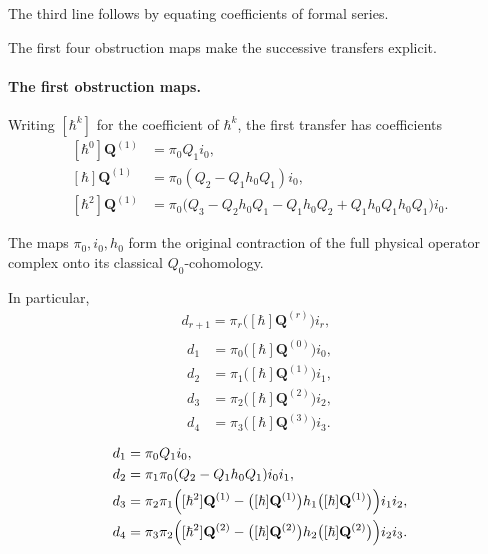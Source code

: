\documentclass[11pt]{article}
\numberwithin{equation}{section}
\numberwithin{figure}{section}
\numberwithin{table}{section}
\begin{document}
The third line follows by equating coefficients of formal series.

The first four obstruction maps make the successive transfers explicit.

\paragraph{The first obstruction maps.}\label{the-first-obstruction-maps}

Writing $[\hbar^k]$ for the coefficient of $\hbar^k$, the first transfer has coefficients
\begin{equation}\label{eq-first-page-series}
\begin{aligned}
[\hbar^0]\mathbf Q^{(1)}&=\pi_0Q_1i_0,\\
[\hbar]\mathbf Q^{(1)}&=\pi_0(Q_2-Q_1h_0Q_1)i_0,\\
[\hbar^2]\mathbf Q^{(1)}&=\pi_0\bigl(
Q_3-Q_2h_0Q_1-Q_1h_0Q_2
+Q_1h_0Q_1h_0Q_1\bigr)i_0.
\end{aligned}
\end{equation}

The maps $\pi_0,i_0,h_0$ form the original contraction of the full physical operator complex onto its classical $Q_0$-cohomology.

In particular,
\begin{equation}\label{eq-page-differentials}
\begin{gathered}
d_{r+1}=\pi_r\bigl([\hbar]\mathbf Q^{(r)}\bigr)i_r,\\
\begin{aligned}
d_1&=\pi_0\bigl([\hbar]\mathbf Q^{(0)}\bigr)i_0,\\
d_2&=\pi_1\bigl([\hbar]\mathbf Q^{(1)}\bigr)i_1,\\
d_3&=\pi_2\bigl([\hbar]\mathbf Q^{(2)}\bigr)i_2,\\
d_4&=\pi_3\bigl([\hbar]\mathbf Q^{(3)}\bigr)i_3.
\end{aligned}
\end{gathered}
\end{equation}
\begin{equation}\label{b-00699}
\begin{aligned}
d_1&=\pi_0Q_1i_0,\\
d_2&=\pi_1\pi_0(Q_2-Q_1h_0Q_1)i_0i_1,\\
d_3&=\pi_2\pi_1\Bigl([\hbar^2]\mathbf Q^{(1)}-
\bigl([\hbar]\mathbf Q^{(1)}\bigr)h_1\bigl([\hbar]\mathbf Q^{(1)}\bigr)\Bigr)i_1i_2,\\
d_4&=\pi_3\pi_2\Bigl([\hbar^2]\mathbf Q^{(2)}-
\bigl([\hbar]\mathbf Q^{(2)}\bigr)h_2\bigl([\hbar]\mathbf Q^{(2)}\bigr)\Bigr)i_2i_3.
\end{aligned}
\end{equation}
\end{document}
